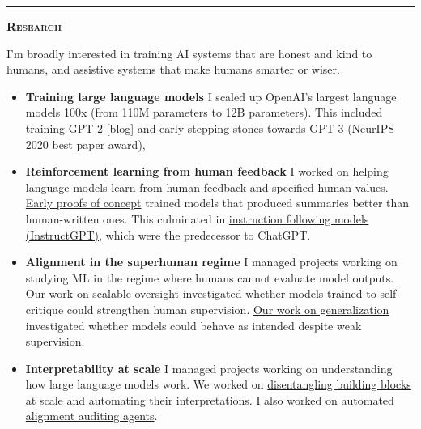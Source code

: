 \documentclass[11 pt]{article}
\begin{document}
\hrule

\begin{center}\begin{Large}\textsc{\textbf{Research}\\}\end{Large}\end{center}

I'm broadly interested in training AI systems that are honest and kind to humans, and assistive systems that make humans smarter or wiser.

\begin{itemize}

\item \textbf{Training large language models}
I scaled up OpenAI's largest language models 100x (from 110M parameters to 12B parameters).  %
This included training \href{https://d4mucfpksywv.cloudfront.net/better-language-models/language_models_are_unsupervised_multitask_learners.pdf}{GPT-2} \href{https://openai.com/blog/better-language-models/}{[blog]} and early stepping stones towards \href{https://arxiv.org/pdf/2005.14165.pdf}{GPT-3} (NeurIPS 2020 best paper award),

\item \textbf{Reinforcement learning from human feedback}
I worked on helping language models learn from human feedback and specified human values. \href{https://openai.com/blog/learning-to-summarize-with-human-feedback/}{Early proofs of concept} trained models that produced summaries better than human-written ones.  This culminated in \href{https://openai.com/blog/instruction-following/}{instruction following models (InstructGPT)}, which were the predecessor to ChatGPT.

\item \textbf{Alignment in the superhuman regime}
I managed projects working on studying ML in the regime where humans cannot evaluate model outputs. \href{https://openai.com/index/critiques/}{Our work on scalable oversight} investigated whether models trained to self-critique could strengthen human supervision.  \href{https://openai.com/index/weak-to-strong-generalization/}{Our work on generalization} investigated whether models could behave as intended despite weak supervision.

\item \textbf{Interpretability at scale}
I managed projects working on understanding how large language models work.  We worked on \href{https://openai.com/index/extracting-concepts-from-gpt-4/}{disentangling building blocks at scale} and \href{https://openai.com/index/language-models-can-explain-neurons-in-language-models/}{automating their interpretations}.  I also worked on \href{https://alignment.anthropic.com/2025/automated-auditing/}{automated alignment auditing agents}.


\end{itemize}
\end{document}
